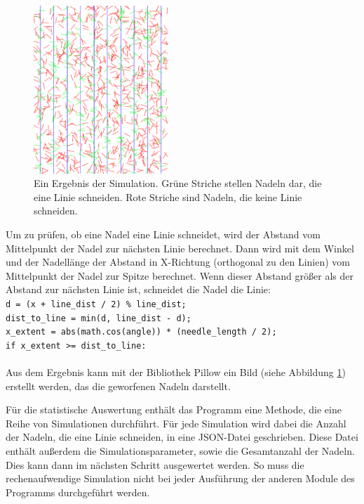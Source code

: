 \documentclass[10pt,twocolumn]{scrartcl}
\begin{document}
		\begin{figure}[htb]
			\centering
			\includegraphics[width=0.45\textwidth]{images/needels.png}
			\caption{Ein Ergebnis der Simulation. Grüne Striche stellen Nadeln dar, die eine Linie schneiden. Rote Striche sind Nadeln, die keine Linie schneiden.}
			\label{fig:needels}
		\end{figure}

		Um zu prüfen, ob eine Nadel eine Linie schneidet, wird der Abstand vom Mittelpunkt der Nadel zur nächsten Linie berechnet. Dann wird mit dem Winkel und der Nadellänge der Abstand in X-Richtung (orthogonal zu den Linien) vom Mittelpunkt der Nadel zur Spitze berechnet. Wenn dieser Abstand größer als der Abstand zur nächsten Linie ist, schneidet die Nadel die Linie:\\
		\texttt{d = (x + line\_dist / 2) \% line\_dist;\\
			dist\_to\_line = min(d, line\_dist - d);\\
			x\_extent = abs(math.cos(angle)) * (needle\_length / 2);\\
			if x\_extent >= dist\_to\_line:}\\
		\\
		Aus dem Ergebnis kann mit der Bibliothek Pillow\cite{Pillow} ein Bild (siehe Abbildung \ref{fig:needels}) erstellt werden, das die geworfenen Nadeln darstellt.

		Für die statistische Auswertung enthält das Programm eine Methode, die eine Reihe von Simulationen durchführt. Für jede Simulation wird dabei die Anzahl der Nadeln, die eine Linie schneiden, in eine JSON-Datei geschrieben. Diese Datei enthält außerdem die Simulationsparameter, sowie die Gesamtanzahl der Nadeln. Dies kann dann im nächsten Schritt ausgewertet werden. So muss die rechenaufwendige Simulation nicht bei jeder Ausführung der anderen Module des Programms durchgeführt werden.
\end{document}
